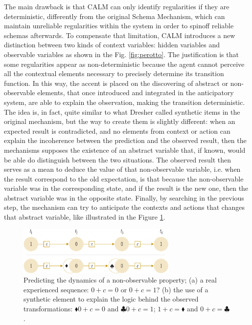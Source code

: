 \documentclass[runningheads]{llncs}
\begin{document}
The main drawback is that CALM can only identify regularities if they are deterministic, differently from the original Schema Mechanism, which can maintain unreliable regularities within the system in order to spinoff reliable schemas afterwards. 
To compensate that limitation, CALM introduces a new distinction between two kinds of context variables: hidden variables and observable variables as shown in the Fig. \ref{fig:perotto}.
The justification is that some regularities appear as non-deterministic because the agent cannot perceive all the contextual elements necessary to precisely determine its transition function.
In this way, the accent is placed on the discovering of abstract or non-observable elements, that once introduced and integrated in the anticipatory system, are able to explain the observation, making the transition deterministic. 
The idea is, in fact, quite similar to what Dresher called synthetic items in the original mechanism, but the way to create them is slightly different: 
when an expected result is contradicted, and no elements from context or action can explain the incoherence between the prediction and the observed result, then the mechanisms supposes the existence of an abstract variable that, if known, would be able do distinguish between the two situations.
The observed result then serves as a mean to deduce the value of that non-observable variable, i.e. when the result correspond to the old expectation, is that because the non-observable variable was in the corresponding state, and if the result is the new one, then the abstract variable was in the opposite state.
Finally, by searching in the previous step, the mechanism can try to anticipate the contexts and actions that changes that abstract variable, like illustrated in the Figure \ref{fig:perotto_abstraction}.
%
\begin{figure}
	\centering
	\includegraphics[width=0.7\textwidth]{Figure_perotto_abstract.png}
	\caption{Predicting the dynamics of a non-observable property; (a) a real experienced sequence: $0 + c = 0$ or $0 + c = 1$? (b) the use of a synthetic element to explain the logic behind the observed transformations: $\blacklozenge 0 + c = 0$ and $\clubsuit 0 + c = 1$; $1 + c = \blacklozenge$ and $0 + c = \clubsuit$.} 
	\label{fig:perotto_abstraction}
\end{figure}
\end{document}

